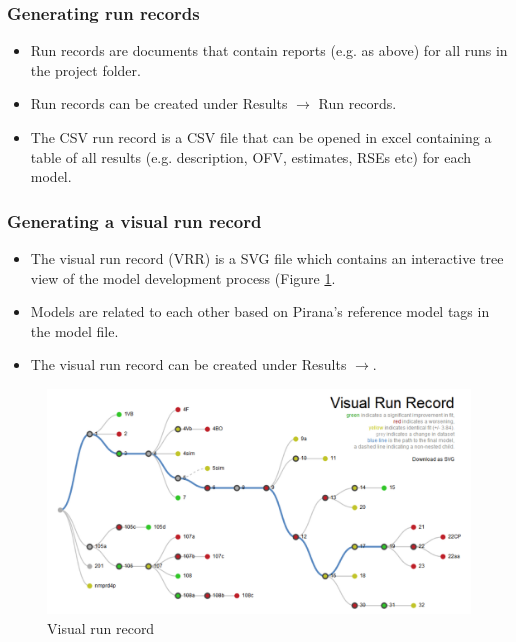 \subsubsection*{Generating run records}
\begin{itemize}
\item Run records are documents that contain reports (e.g. as above) for all runs in the project folder.
\item Run records can be created under Results $\rightarrow$ Run records. 
\item The CSV run record is a CSV file that can be opened in excel containing a table of all results (e.g. description, OFV, estimates, RSEs etc) for each model. 
\end{itemize}


\subsubsection*{Generating a visual run record}
\begin{itemize}
\item The visual run record (VRR) is a SVG file which contains an
 interactive tree view of the model development process (Figure \ref{fig:Fig6}. 
\item Models are related to each other based on Pirana's reference model
 tags in the model file.
\item The visual run record can be created under Results $\rightarrow$. 
\end{itemize}

\begin{figure}[h] \centering
    \includegraphics[scale=.4]{images/vrr.png}
    \caption{Visual run record\label{fig:Fig6}}
\end{figure}



